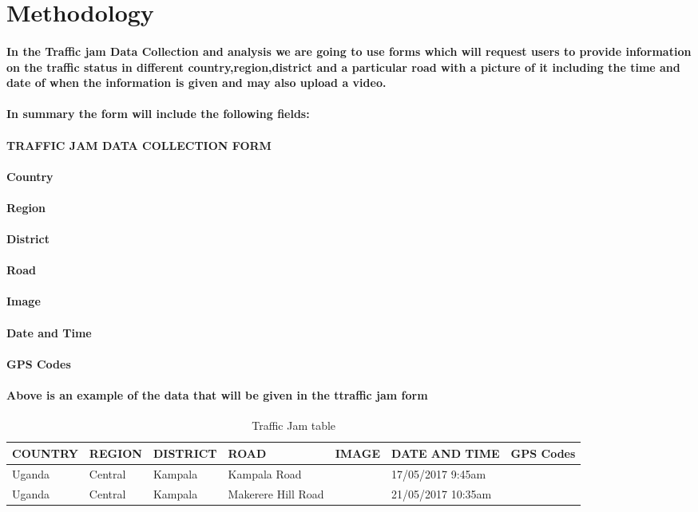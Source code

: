 \documentclass{article}
\begin{document}
\section{Methodology}
\paragraph{In the Traffic jam Data Collection and analysis we are  going to use  forms which will request users to provide information on the traffic status in different country,region,district and a particular road with a picture of it including the time and date of  when the information is given and may also upload a video.}
\paragraph{In summary the form will include the following fields:}
\paragraph{   TRAFFIC JAM DATA COLLECTION FORM}
\paragraph{Country}
\paragraph{Region}
\paragraph{District}
\paragraph{Road}
\paragraph{Image}
\paragraph{Date and Time}
\paragraph{GPS Codes}
\paragraph{Above is an example of the data that will be given in the ttraffic jam form}


\begin{table}[t]
\centering
\caption{Traffic Jam table}
\begin{tabular}{|l|l|l|l|l|l|l|}
\hline
COUNTRY & REGION &DISTRICT & ROAD& IMAGE & DATE AND TIME&GPS Codes\\ \hline
Uganda &  Central    & Kampala  & Kampala Road  &  & 17/05/2017 9:45am \\ \hline
Uganda &  Central    & Kampala  & Makerere Hill Road &  & 21/05/2017 10:35am \\ \hline
\end{tabular}
\end{table}
\end{document}
